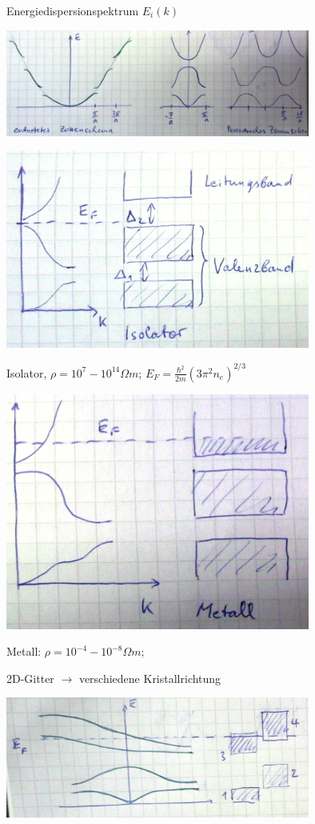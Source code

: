 Energiedispersionspektrum \(E_i(k)\)

\includegraphics[width=0.75\textwidth]{kap06_42.png}


\includegraphics[width=0.75\textwidth]{kap06_43.png}

Isolator, \(\rho = 10^7-10^{14}\Omega m\); \(E_F = \frac{\hbar^2}{2m}(3\pi^2 n_e)^{2/3}\)

\includegraphics[width=0.75\textwidth]{kap06_44.png}

Metall: \(\rho = 10^{-4}-10^{-8}\Omega m\); 


2D-Gitter \(\rightarrow \) verschiedene Kristallrichtung


\includegraphics[width=0.75\textwidth]{kap06_45.png}


